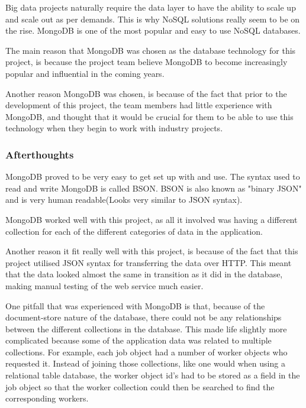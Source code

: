 \bigskip

Big data projects naturally require the data layer to have the ability to scale up and scale out as per demands. This is why NoSQL solutions really seem to be on the rise. MongoDB is one of the most popular and easy to use NoSQL databases.

\bigskip

The main reason that MongoDB was chosen as the database technology for this project, is because the project team believe MongoDB to become increasingly popular and influential in the coming years.

\bigskip
Another reason MongoDB was chosen, is because of the fact that prior to the development of this project, the team members had little experience with MongoDB, and thought that it would be crucial for them to be able to use this technology when they begin to work with industry projects.

\subsubsection{Afterthoughts}
MongoDB proved to be very easy to get set up with and use. The syntax used to read and write MongoDB is called BSON. BSON is also known as "binary JSON" and is very human readable(Looks very similar to JSON syntax).

\bigskip
MongoDB worked well with this project, as all it involved was having a different collection for each of the different categories of data in the application. 

Another reason it fit really well with this project, is because of the fact that this project utilised JSON syntax for transferring the data over HTTP. This meant that the data looked almost the same in transition as it did in the database, making manual testing of the web service much easier.

\bigskip

One pitfall that was experienced with MongoDB is that, because of the document-store nature of the database, there could not be any relationships between the different collections in the database. This made life slightly more complicated because some of the application data was related to multiple collections. For example, each job object had a number of worker objects who requested it. Instead of joining those collections, like one would when using a relational table database, the worker object id's had to be stored as a field in the job object so that the worker collection could then be searched to find the corresponding workers. 

